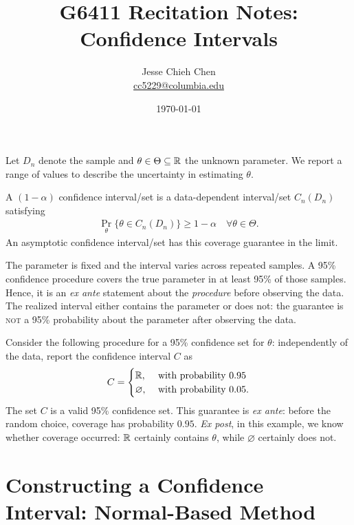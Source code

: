 \documentclass[a4paper,12pt]{article}
\title{G6411 Recitation Notes: Confidence Intervals}
\author{Jesse Chieh Chen\\\href{mailto:cc5229@columbia.edu}{cc5229@columbia.edu}}
\date{\today}
\begin{document}
\maketitle

\noindent
Let $D_n$ denote the sample and $\theta\in\Theta\subseteq\mathbb{R}$ the unknown parameter.
We report a range of values to describe the uncertainty in estimating $\theta$.

\begin{definition}
	A $(1-\alpha)$ confidence interval/set is a data-dependent interval/set $C_n(D_n)$ satisfying
	\begin{align}
		\Pr_\theta\big\{\theta\in C_n(D_n)\big\}\ge1-\alpha
		\quad\forall \theta\in\Theta.
	\end{align}
	An asymptotic confidence interval/set has this coverage guarantee in the limit.
\end{definition}

\begin{remark}
	The parameter is fixed and the interval varies across repeated samples.
	A 95\% confidence procedure covers the true parameter in at least 95\% of those samples.
	Hence, it is an \emph{ex ante} statement about the \emph{procedure} before observing the data.
	The realized interval either contains the parameter or does not:
	the guarantee is \textsc{not} a 95\% probability about the parameter after observing the data.
\end{remark}

\begin{example}
	Consider the following procedure for a 95\% confidence set for $\theta$:
	independently of the data, report the confidence interval $C$ as
	\begin{align}
		C = 
		\begin{cases}
			\mathbb{R}, & \text{ with probability $0.95$}\\
			\varnothing, & \text{ with probability $0.05$.}
		\end{cases}
	\end{align}
	The set $C$ is a valid 95\% confidence set.
	This guarantee is \emph{ex ante}: before the random choice, coverage has probability $0.95$.
	\emph{Ex post}, in this example, we know whether coverage occurred: $\mathbb{R}$ certainly contains $\theta$, while $\varnothing$ certainly does not.
\end{example}

\section{Constructing a Confidence Interval: Normal-Based Method}
\end{document}
